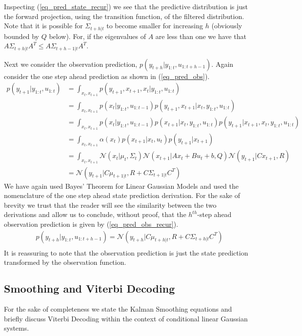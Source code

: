\documentclass[../masters.tex]{subfiles}
\begin{document}
Inspecting (\ref{eq_pred_state_recur}) we see that the predictive distribution is just the forward projection, using the transition function, of the filtered distribution. Note that it is possible for $\Sigma_{t+h|t}$ to become smaller for increasing $h$ (obviously bounded by $Q$ below). For, if the eigenvalues of $A$ are less than one we have that $A\Sigma_{t+h|t}A^T \leq A\Sigma_{t+h-1|t}A^T$.

Next we consider the observation prediction, $p(y_{t+h}|y_{1:t}, u_{1:t+h-1})$. Again consider the one step ahead prediction as shown in (\ref{eq_pred_obs}).
\begin{equation}
\begin{aligned}
p(y_{t+1}|y_{1:t}, u_{1:t}) &= \int_{x_t, x_{t+1}} p(y_{t+1},x_{t+1},x_t|y_{1:t}, u_{1:t}) \\
&= \int_{x_t, x_{t+1}} p(x_t|y_{1:t}, u_{1:t-1})p(y_{t+1},x_{t+1}|x_t, y_{1:t}, u_{1:t}) \\
&= \int_{x_t, x_{t+1}} p(x_t|y_{1:t}, u_{1:t-1}) p(x_{t+1}|x_t, y_{1:t}, u_{1:t})p(y_{t+1}|x_{t+1}, x_t, y_{1:t}, u_{1:t}) \\
&= \int_{x_t, x_{t+1}} \alpha(x_t) p(x_{t+1}|x_t, u_{t}) p(y_{t+1}|x_{t+1}) \\
&= \int_{x_t, x_{t+1}} \mathcal{N}(x_t|\mu_t,\Sigma_t) \mathcal{N}(x_{t+1}|Ax_t+Bu_t+b, Q) \mathcal{N}(y_{t+1}|Cx_{t+1}, R) \\
&= \mathcal{N}(y_{t+1}|C\mu_{t+1|t}, R+C\Sigma_{t+1|t}C^T)
\end{aligned}
\label{eq_pred_obs}
\end{equation}
We have again used Bayes' Theorem for Linear Gaussian Models and used the nomenclature of the one step ahead state prediction derivation. For the sake of brevity we trust that the reader will see the similarity between the two derivations and allow us to conclude, without proof, that the $h^{th}$-step ahead observation prediction is given by (\ref{eq_pred_obs_recur}).
\begin{equation}
\begin{aligned}
&p(y_{t+h}|y_{1:t}, u_{1:t+h-1}) = \mathcal{N}(y_{t+h}|C\mu_{t+h|t}, R+C\Sigma_{t+h|t}C^T) \\
\end{aligned}
\label{eq_pred_obs_recur}
\end{equation}
It is reassuring to note that the observation prediction is just the state prediction transformed by the observation function.

\subsection{Smoothing and Viterbi Decoding}
For the sake of completeness we state the Kalman Smoothing equations and briefly discuss Viterbi Decoding within the context of conditional linear Gaussian systems. 
\end{document}
